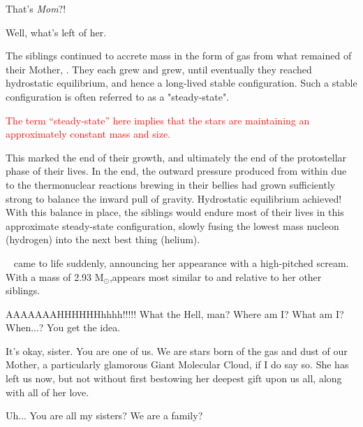 \documentclass[main.tex]{subfiles}
\begin{document}
\par \Electra That's \textit{Mom}?!

\par \Maia Well, what's left of her.

\par \nar The siblings continued to accrete mass in the form of gas from what remained of their Mother, \rmpleione.  They each grew and grew, until eventually they reached hydrostatic equilibrium, and hence a long-lived stable configuration.  Such a stable configuration is often referred to as a "steady-state".

\begin{tcolorbox}[sharp corners, colback=red!30, colframe=red!80!blue, title=Steady-State]
\par \textcolor{red} {The term ``steady-state'' here implies that the stars are maintaining an approximately constant mass and size.} 
\end{tcolorbox}

\par \nar This marked the end of their growth, and ultimately the end of the protostellar phase of their lives.  In the end, the outward pressure produced from within due to the thermonuclear reactions brewing in their bellies had grown sufficiently strong to balance the inward pull of gravity.  Hydrostatic equilibrium achieved!  With this balance in place, the siblings would endure most of their lives in this approximate steady-state configuration, slowly fusing the lowest mass nucleon (hydrogen) into the next best thing (helium).

\par \nar \rmsterope~ came to life suddenly, announcing her appearance with a high-pitched scream.  With a mass of 2.93 M$_{\odot}$,\rmsterope appears most similar to \rmtaygete and \rmalcyone relative to her other siblings.

\par \Sterope AAAAAAAHHHHHHhhhh!!!!!  What the Hell, man?  Where am I?  What am I?  When...?  You get the idea.

\par \Maia It's okay, sister.  You are one of us.  We are stars born of the gas and dust of our Mother, a particularly glamorous Giant Molecular Cloud, if I do say so.  She has left us now, but not without first bestowing her deepest gift upon us all, along with all of her love.

\par \Sterope  Uh... You are all my sisters?  We are a family?
\end{document}
